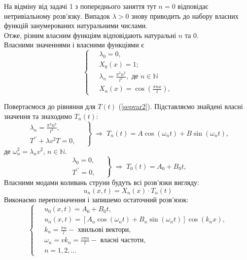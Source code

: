 На відміну від задачі 1 з попереднього заняття тут $n = 0$ відповідає нетривіальному розв'язку. Випадок $\lambda > 0$ знову приводить до набору власних функцій занумерованих натуральними числами.\\
Отже, різним власним функціям відповідають натуральні $n$ та $0$.\\
    Власними значеннями і власними функціями є
    \begin{equation} \label{ShLsol2}
        \left\{ \begin{aligned}
            &\lambda_0 = 0,\\
            &X_0(x) = 1;\\
            \;&\lambda_n = \frac{\pi^2 n^2}{l^2}, \text{ де } n \in \mathbb{N}\\ 
            &X_n(x) = \cos\left(\frac{\pi n x}{l}\right),
        \end{aligned} \right.
    \end{equation}

Повертаємося до рівняння для $T(t)$ (\ref{sepvar2}). Підставляємо знайдені власні значення та знаходимо $T_n(t)$:
\begin{equation*}
    \left. \begin{aligned}
        \lambda_n = \frac{\pi^2 n^2}{l^2},&\;\\ 
        T^{\prime\prime} + \lambda v^2T = 0,&
    \end{aligned} \right\}
    \;\Rightarrow\;
    T_n(t) = A\cos(\omega_n t) + B\sin(\omega_n t),
\end{equation*}
де $\omega_n^2 = \lambda_n v^2, \, n \in \mathbb{N}.$\\
\begin{equation*}
    \left. \begin{aligned}
        \lambda_0 = 0,&\;\\ 
        T^{\prime\prime} = 0,&
    \end{aligned} \right\}
    \;\Rightarrow\;
    T_0(t) = A_0 + B_0 t,
\end{equation*}
Власними модами коливань струни будуть всі розв'язки вигляду:
\begin{equation*}
    u_n(x,t) = X_n(x) \cdot T_n(t)
\end{equation*}
Виконаємо перепозначення і запишемо остаточний розв'язок:
\begin{equation}
    \left\{ \begin{aligned} \label{sol2}
        \;&u_0(x,t) = A_0 + B_0 t, \\
        &u_n(x,t) = \left[A_n\cos(\omega_n t) + B_n\sin(\omega_n t)\right] \cos(k_n x), \\
        &k_n = \frac{\pi n}{l} - \text{ хвильові вектори}, \\
        &\omega_n = vk_n = \frac{v \pi n}{l} - \text{ власні частоти}, \\
        &n = 1, 2,\ldots
    \end{aligned}\right.
\end{equation}

